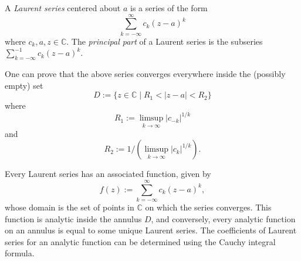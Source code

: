 \documentclass[12pt]{article}
\begin{document}
A \emph{Laurent series} centered about $a$ is a series of the form
$$
\sum_{k=-\infty}^\infty c_k (z-a)^k
$$
where $c_k, a, z \in \mathbb{C}$. The \emph{principal part} of a Laurent series is the subseries $\sum_{k=-\infty}^{-1} c_k (z-a)^k$.

One can prove that the above series converges everywhere inside the (possibly empty) set
$$
D := \{z \in \mathbb{C} \mid R_1 < |z-a| < R_2 \}
$$
where
$$
R_1 := \limsup_{k \rightarrow\infty} |c_{-k}|^{1/k}
$$
and
$$
R_2 := 1/\left(\limsup_{k \rightarrow\infty} |c_{k}|^{1/k}\right).
$$

Every Laurent series has an associated function, given by
$$
f(z) := \sum_{k=-\infty}^\infty c_k (z-a)^k,
$$
whose domain is the set of points in $\mathbb{C}$ on which the series converges. This function is analytic inside the annulus $D$, and conversely, every analytic function on an annulus is equal to some unique Laurent series. The coefficients of Laurent series for an analytic function can be determined using the Cauchy integral formula.
\end{document}
